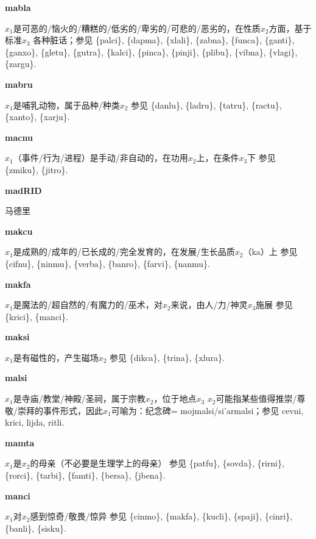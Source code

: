 \documentclass[notitlepage,twocolumn,a4paper,10pt]{book}
\begin{document}
{\sffamily\bfseries mabla}\enspace {\ttfamily\bfseries[mal]}  $x_1$是可恶的\slash{}恼火的\slash{}糟糕的\slash{}低劣的\slash{}卑劣的\slash{}可悲的\slash{}恶劣的，在性质$x_2$方面，基于标准$x_3$ \textemdash{} 各种脏话；参见 \{palci\}, \{dapma\}, \{xlali\}, \{zabna\}, \{funca\}, \{ganti\}, \{ganxo\}, \{gletu\}, \{gutra\}, \{kalci\}, \{pinca\}, \{pinji\}, \{plibu\}, \{vibna\}, \{vlagi\}, \{zargu\}.

{\sffamily\bfseries mabru}\enspace {\ttfamily\bfseries[mab]}  $x_1$是哺乳动物，属于品种\slash{}种类$x_2$ \textemdash{} 参见 \{danlu\}, \{ladru\}, \{tatru\}, \{ractu\}, \{xanto\}, \{xarju\}.

{\sffamily\bfseries macnu}\enspace {\ttfamily\bfseries[    cnu]}  $x_1$（事件\slash{}行为\slash{}进程）是手动\slash{}非自动的，在功用$x_2$上，在条件$x_3$下 \textemdash{} 参见 \{zmiku\}, \{jitro\}.

{\sffamily\bfseries madRID} 马德里

{\sffamily\bfseries makcu}\enspace {\ttfamily\bfseries[        ma'u]}  $x_1$是成熟的\slash{}成年的\slash{}已长成的\slash{}完全发育的，在发展\slash{}生长品质$x_2$（ka）上 \textemdash{} 参见 \{cifnu\}, \{ninmu\}, \{verba\}, \{banro\}, \{farvi\}, \{nanmu\}.

{\sffamily\bfseries makfa}\enspace {\ttfamily\bfseries[maf]}  $x_1$是魔法的\slash{}超自然的\slash{}有魔力的\slash{}巫术，对$x_2$来说，由人\slash{}力\slash{}神灵$x_3$施展 \textemdash{} 参见 \{krici\}, \{manci\}.

{\sffamily\bfseries maksi}\enspace {\ttfamily\bfseries[mak]}  $x_1$是有磁性的，产生磁场$x_2$ \textemdash{} 参见 \{dikca\}, \{trina\}, \{xlura\}.

{\sffamily\bfseries malsi}\enspace {\ttfamily\bfseries[mas]}  $x_1$是寺庙\slash{}教堂\slash{}神殿\slash{}圣祠，属于宗教$x_2$，位于地点$x_3$ \textemdash{} $x_2$可能指某些值得推崇\slash{}尊敬\slash{}崇拜的事件形式，因此$x_1$可喻为：纪念碑= {mojmalsi}\slash{}{si'armalsi}；参见 {cevni}, {krici}, {lijda}, {ritli}.

{\sffamily\bfseries mamta}\enspace {\ttfamily\bfseries[mam]}  $x_1$是$x_2$的母亲（不必要是生理学上的母亲） \textemdash{} 参见 \{patfu\}, \{sovda\}, \{rirni\}, \{rorci\}, \{tarbi\}, \{famti\}, \{bersa\}, \{jbena\}.

{\sffamily\bfseries manci}\enspace {\ttfamily\bfseries[mac]}  $x_1$对$x_2$感到惊奇\slash{}敬畏\slash{}惊异 \textemdash{} 参见 \{cinmo\}, \{makfa\}, \{kucli\}, \{spaji\}, \{cinri\}, \{banli\}, \{sisku\}.
\end{document}
